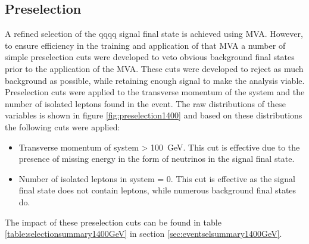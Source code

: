
\subsection{Preselection}
\label{sec:preselection1400GeV}
A refined selection of the \nu{\nu}qqqq signal final state is achieved using MVA.  However, to ensure efficiency in the training and application of that MVA a number of simple preselection cuts were developed to veto obvious background final states prior to the application of the MVA.  These cuts were developed to reject as much background as possible, while retaining enough signal to make the analysis viable.  Preselection cuts were applied to the transverse momentum of the system and the number of isolated leptons found in the event.  The raw distributions of these variables is shown in figure \ref{fig:preselection1400} and based on these distributions the following cuts were applied:

\begin{itemize}
\item Transverse momentum of system > 100~GeV.  This cut is effective due to the presence of missing energy in the form of neutrinos in the signal final state.
\item Number of isolated leptons in system = 0.  This cut is effective as the signal final state does not contain leptons, while numerous background final states do.  
\end{itemize}

The impact of these preselection cuts can be found in table \ref{table:selectionsummary1400GeV} in section \ref{sec:eventselsummary1400GeV}.


